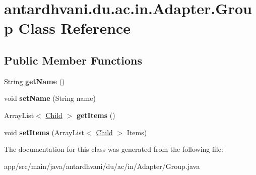 \hypertarget{classantardhvani_1_1du_1_1ac_1_1in_1_1_adapter_1_1_group}{}\section{antardhvani.\+du.\+ac.\+in.\+Adapter.\+Group Class Reference}
\label{classantardhvani_1_1du_1_1ac_1_1in_1_1_adapter_1_1_group}
\subsection*{Public Member Functions}
\begin{DoxyCompactItemize}
\item 
\hypertarget{classantardhvani_1_1du_1_1ac_1_1in_1_1_adapter_1_1_group_ad448ef9b062e70628c0943a2c59945c4}{}String {\bfseries get\+Name} ()\label{classantardhvani_1_1du_1_1ac_1_1in_1_1_adapter_1_1_group_ad448ef9b062e70628c0943a2c59945c4}

\item 
\hypertarget{classantardhvani_1_1du_1_1ac_1_1in_1_1_adapter_1_1_group_a5389584db1977be6b5a2e5e1fd0c31da}{}void {\bfseries set\+Name} (String name)\label{classantardhvani_1_1du_1_1ac_1_1in_1_1_adapter_1_1_group_a5389584db1977be6b5a2e5e1fd0c31da}

\item 
\hypertarget{classantardhvani_1_1du_1_1ac_1_1in_1_1_adapter_1_1_group_a9a62d01258f315d2d28de29b62771ce9}{}Array\+List$<$ \hyperlink{classantardhvani_1_1du_1_1ac_1_1in_1_1_adapter_1_1_child}{Child} $>$ {\bfseries get\+Items} ()\label{classantardhvani_1_1du_1_1ac_1_1in_1_1_adapter_1_1_group_a9a62d01258f315d2d28de29b62771ce9}

\item 
\hypertarget{classantardhvani_1_1du_1_1ac_1_1in_1_1_adapter_1_1_group_a513e589a7bdd344690cbd785114e0deb}{}void {\bfseries set\+Items} (Array\+List$<$ \hyperlink{classantardhvani_1_1du_1_1ac_1_1in_1_1_adapter_1_1_child}{Child} $>$ Items)\label{classantardhvani_1_1du_1_1ac_1_1in_1_1_adapter_1_1_group_a513e589a7bdd344690cbd785114e0deb}

\end{DoxyCompactItemize}


The documentation for this class was generated from the following file\+:\begin{DoxyCompactItemize}
\item 
app/src/main/java/antardhvani/du/ac/in/\+Adapter/Group.\+java\end{DoxyCompactItemize}
